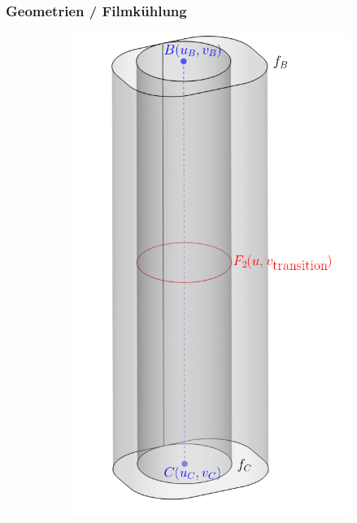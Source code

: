 \documentclass[8pt, aspectratio=169]{beamer}
\begin{document}
\begin{frame}
	\frametitle{Geometrien / Filmkühlung}
	\vspace{0cm}
	\centering
	\begin{minipage}[t]{.5\textwidth}
		\begin{figure}[H]
			\centering
			\begin{subfigure}{.49\textwidth}
				\includegraphics[width=\textwidth]{../../tec/holes/00edit.png}
			\end{subfigure}
			\begin{subfigure}{.49\textwidth}

\end{subfigure}
\end{figure}
\end{minipage}
\end{frame}
\end{document}
